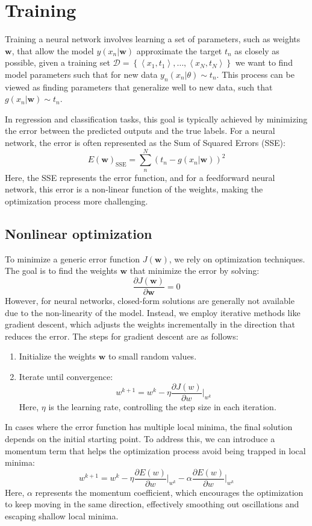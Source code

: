 \section{Training}

Training a neural network involves learning a set of parameters, such as weights $\mathbf{w}$, that allow the model $y(x_n|\mathbf{w})$ approximate the target $t_n$ as closely as possible, given a training set $\mathcal{D}=\left\{\left\langle x_1,t_1 \right\rangle,\dots,\left\langle x_N,t_N\right\rangle\right\}$ we want to find model parameters such that for new data $y_n(x_n|\theta)\sim t_n$.
This process can be viewed as finding parameters that generalize well to new data, such that $g(x_n|\mathbf{w})\sim t_n$. 

In regression and classification tasks, this goal is typically achieved by minimizing the error between the predicted outputs and the true labels. 
For a neural network, the error is often represented as the Sum of Squared Errors (SSE):
\[E(\mathbf{w})_{\text{SSE}}=\sum_n^N\left(t_n-g(x_n|\mathbf{w})\right)^2\]
Here, the SSE represents the error function, and for a feedforward neural network, this error is a non-linear function of the weights, making the optimization process more challenging.

\subsection{Nonlinear optimization}
To minimize a generic error function $J(\mathbf{w})$, we rely on optimization techniques.
The goal is to find the weights $\mathbf{w}$ that minimize the error by solving:
\[\dfrac{\partial J(\mathbf{w})}{\partial \mathbf{w}}=0\]
However, for neural networks, closed-form solutions are generally not available due to the non-linearity of the model. 
Instead, we employ iterative methods like gradient descent, which adjusts the weights incrementally in the direction that reduces the error.
The steps for gradient descent are as follows:
\begin{enumerate}
    \item Initialize the weights $\mathbf{w}$ to small random values.
    \item Iterate until convergence: 
        \[w^{k+1}=w^k-\eta\dfrac{\partial J(w)}{\partial w}\Bigg|_{w^k}\]
        Here, $\eta$ is the learning rate, controlling the step size in each iteration. 
\end{enumerate}
In cases where the error function has multiple local minima, the final solution depends on the initial starting point. 
To address this, we can introduce a momentum term that helps the optimization process avoid being trapped in local minima:
\[w^{k+1}=w^k-\eta\dfrac{\partial E(w)}{\partial w}\Bigg|_{w^k}-\alpha\dfrac{\partial E(w)}{\partial w}\Bigg|_{w^k}\]
Here, $\alpha$ represents the momentum coefficient, which encourages the optimization to keep moving in the same direction, effectively smoothing out oscillations and escaping shallow local minima.

